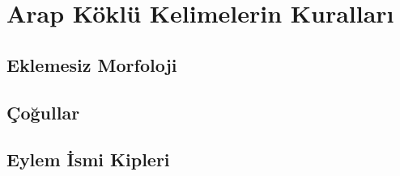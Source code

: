 
\chapter{Arap Köklü Kelimelerin Kuralları}
\section{Eklemesiz Morfoloji}

\section{Çoğullar}

\section{Eylem İsmi Kipleri}


